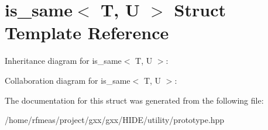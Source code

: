 \hypertarget{structis__same}{}\section{is\+\_\+same$<$ T, U $>$ Struct Template Reference}
\label{structis__same}


Inheritance diagram for is\+\_\+same$<$ T, U $>$\+:


Collaboration diagram for is\+\_\+same$<$ T, U $>$\+:


The documentation for this struct was generated from the following file\+:\begin{DoxyCompactItemize}
\item 
/home/rfmeas/project/gxx/gxx/\+H\+I\+D\+E/utility/prototype.\+hpp\end{DoxyCompactItemize}
